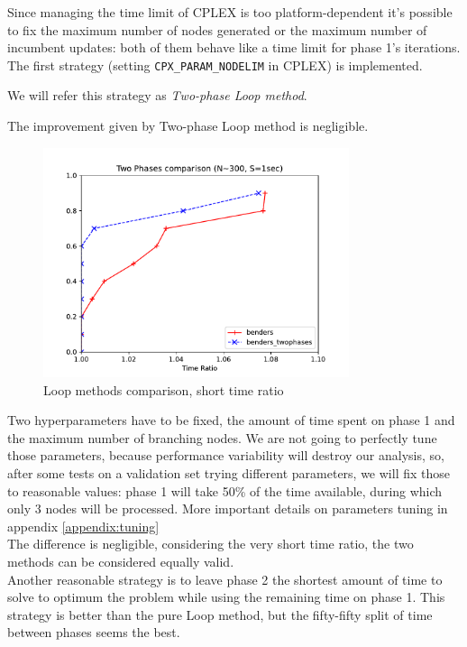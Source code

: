 Since managing the time limit of CPLEX is too platform-dependent it's
possible to fix the maximum number of nodes generated or the maximum number of
incumbent updates: both of them behave like a time limit for phase 1's
iterations. The first strategy (setting \texttt{CPX\_PARAM\_NODELIM} in CPLEX)
is implemented.

We will refer this strategy as \emph{Two-phase Loop method}.

\begin{claim} 
    The improvement given by Two-phase Loop method is negligible.
\end{claim}

\begin{figure}[h]
    \centering
    \includegraphics[width=0.8\textwidth]{figures/benders2phases}
    \caption{Loop methods comparison, short time ratio}
\end{figure}

Two hyperparameters have to be fixed, the amount of time spent on phase 1 and
the maximum number of branching nodes. We are not going to perfectly tune those
parameters, because performance variability will destroy our analysis, so,
after some tests on a validation set trying different parameters, we will fix
those to reasonable values: phase 1 will take 50\% of the time available,
during which only 3 nodes will be processed. More important details on
parameters tuning in appendix \ref{appendix:tuning}\\ The difference is
negligible, considering the very short time ratio, the two methods can be
considered equally valid.\\ Another reasonable strategy is to leave phase 2 the
shortest amount of time to solve to optimum the problem while using the
remaining time on phase 1. This strategy is better than the pure Loop method,
but the fifty-fifty split of time between phases seems the best.

